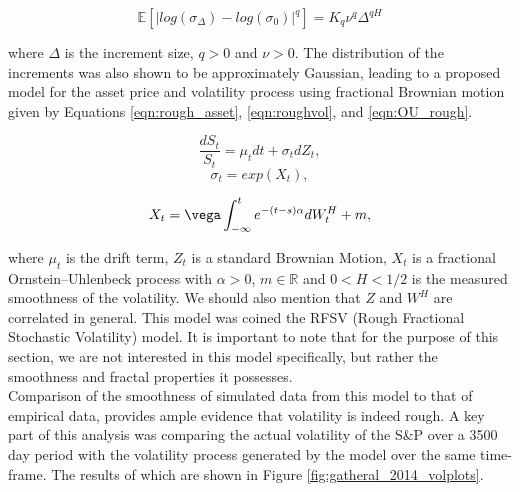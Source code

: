 \documentclass[12pt,oneside]{article}
\begin{document}
\begin{equation}
\label{eqn:scaling_prop}
\mathbb{E}[|log(\sigma_\Delta)-log(\sigma_0)|^q]=K_q\nu^q\Delta^{qH}
\end{equation}

where $\Delta$ is the increment size, $q>0$ and $\nu>0$. The distribution of the increments was also shown to be  approximately Gaussian, leading  to a proposed model for the asset price and volatility process using fractional Brownian motion given by Equations \ref{eqn:rough_asset}, \ref{eqn:roughvol}, and \ref{eqn:OU_rough}.

\begin{equation}
\label{eqn:rough_asset}
 \frac{dS_{t}}{S_{t}} = \mu_{t} dt + \sigma_{t} dZ_{t},
\end{equation}
\begin{equation}
\label{eqn:roughvol}
    \sigma_{t} = exp(X_{t}),
\end{equation}

\begin{equation}
\label{eqn:OU_rough}
X_{t}=\vega\int_{-\infty}^{t} e^{-(t-s)\alpha}dW_{t}^{H}+m,
\end{equation}

where $\mu_{t}$ is the drift term, $Z_{t}$ is a standard Brownian Motion, $X_{t}$ is a fractional Ornstein–Uhlenbeck process with $\alpha>0$, $m\in\mathbb{R}$ and $0<H<1/2$ is the measured smoothness of the volatility. We should also mention that $Z$ and $W^{H}$ are correlated in general. This model was coined the RFSV (Rough Fractional Stochastic Volatility) model. It is important to note that for the purpose of this section, we are not interested in this model specifically, but rather the smoothness and fractal properties it possesses.
\\

Comparison of the smoothness of simulated data from this model to that of empirical data, provides ample evidence that volatility is indeed rough. A key part of this analysis was comparing the actual volatility of the S\&P over a 3500 day period with the volatility process generated by the model over the same time-frame. The results of which are shown in Figure \ref{fig:gatheral_2014_volplots}.
\\
\end{document}
